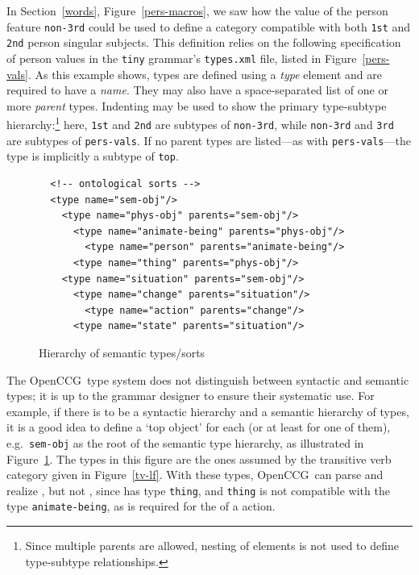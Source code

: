\documentclass[11pt]{article}
\newcommand{\occg}{OpenCCG}
\begin{document}
In Section~\ref{words}, Figure~\ref{pers-macros}, we saw how the value
of the person feature \texttt{non-3rd} could be used to define a
category compatible with both \texttt{1st} and \texttt{2nd} person
singular subjects. This definition relies on the following specification
of person values in the \texttt{tiny} grammar's \texttt{types.xml} file,
listed in Figure~\ref{pers-vals}. As this example shows, types are
defined using a \textsl{type} element and are required to have a
\textsl{name}. They may also have a space-separated list of one or more
\textsl{parent} types. Indenting may be used to show the primary
type-subtype hierarchy:\footnote{Since multiple parents are allowed,
nesting of elements is not used to define type-subtype relationships.}
here, \texttt{1st} and \texttt{2nd} are subtypes of \texttt{non-3rd},
while \texttt{non-3rd} and \texttt{3rd} are subtypes of
\texttt{pers-vals}. If no parent types are listed---as with
\texttt{pers-vals}---the type is implicitly a subtype of \texttt{top}.

\begin{figure}
\begin{verbatim}
  <!-- ontological sorts -->
  <type name="sem-obj"/>
    <type name="phys-obj" parents="sem-obj"/>
      <type name="animate-being" parents="phys-obj"/>
        <type name="person" parents="animate-being"/>
      <type name="thing" parents="phys-obj"/>
    <type name="situation" parents="sem-obj"/>
      <type name="change" parents="situation"/>
        <type name="action" parents="change"/>
      <type name="state" parents="situation"/>
\end{verbatim}
\caption{Hierarchy of semantic types/sorts}
\label{ont-sorts}
\end{figure}

The \occg\ type system does not distinguish between syntactic and
semantic types; it is up to the grammar designer to ensure their
systematic use. For example, if there is to be a syntactic hierarchy and
a semantic hierarchy of types, it is a good idea to define a `top
object' for each (or at least for one of them), e.g.\ \texttt{sem-obj}
as the root of the semantic type hierarchy, as illustrated in
Figure~\ref{ont-sorts}. The types in this figure are the ones assumed by
the transitive verb category given in Figure~\ref{tv-lf}. With these
types, \occg\ can parse and realize , but not
, since  has type \texttt{thing}, and
\texttt{thing} is not compatible with the type \texttt{animate-being},
as is required for the  of a  action.
\end{document}
